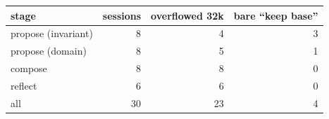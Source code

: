 \begin{tabular}{lrrr}
\toprule
stage & sessions & overflowed 32k & bare ``keep base'' \\
\midrule
propose (invariant) & 8 & 4 & 3 \\
propose (domain) & 8 & 5 & 1 \\
compose & 8 & 8 & 0 \\
reflect & 6 & 6 & 0 \\
\midrule
all & 30 & 23 & 4 \\
\bottomrule
\end{tabular}
